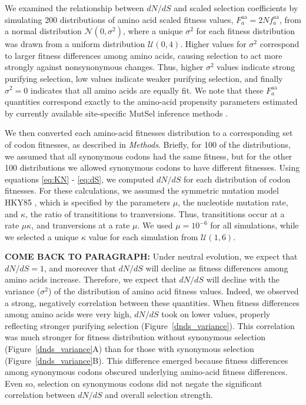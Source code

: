 \documentclass[11pt]{article}
\begin{document}
We examined the relationship between $dN/dS$ and scaled selection coefficients by simulating 200 distributions of amino acid scaled fitness values, $F^\text{aa}_a = 2Nf^\text{aa}_a$, from a normal distribution $\mathcal{N}(0,\sigma^2)$, where a unique $\sigma^2$ for each fitness distribution was drawn from a uniform distribution $\mathcal{U}(0,4)$. Higher values for $\sigma^2$ correspond to larger fitness differences among amino acids, causing selection to act more strongly against nonsynonymous changes. Thus, higher $\sigma^2$ values indicate strong purifying selection, low values indicate weaker purifying selection, and finally $\sigma^2 = 0$ indicates that all amino acids are equally fit. We note that these $F^\text{aa}_a$ quantities correspond exactly to the amino-acid propensity parameters estimated by currently available site-specific MutSel inference methods \cite{RodrigueLartillot2014,Tamurietal2014}.

We then converted each amino-acid fitnesses distribution to a corresponding set of codon fitnesses, as described in \emph{Methods}. Briefly, for 100 of the distributions, we assumed that all synonymous codons had the same fitness, but for the other 100 distributions we allowed synonymous codons to have different fitnesses. Using equations \eqref{eq:KN} - \eqref{eq:dS}, we computed $dN/dS$ for each distribution of codon fitnesses. For these calculations, we assumed the symmetric mutation model HKY85 \cite{HKY85}, which is specified by the parameters $\mu$, the nucleotide mutation rate, and $\kappa$, the ratio of transititions to tranversions. Thus, transititions occur at a rate $\mu\kappa$, and tranversions at a rate $\mu$. We used $\mu = 10^{-6}$ for all simulations, while we selected a unique $\kappa$ value for each simulation from $\mathcal{U}(1,6)$.

\textbf{COME BACK TO PARAGRAPH:}
Under neutral evolution, we expect that $dN/dS = 1$, and moreover that $dN/dS$ will decline as fitness differences among amino acids increase. Therefore, we expect that $dN/dS$ will decline with the variance ($\sigma^2$) of the distribution of amino acid fitness values. Indeed, we observed a strong, negatively correlation between these quantities. When fitness differences among amino acids were very high, $dN/dS$ took on lower values, properly reflecting stronger purifying selection (Figure~\ref{dnds_variance}). This correlation was much stronger for fitness distribution without synonymous selection (Figure~\ref{dnds_variance}A) than for those with synonymous selection (Figure~\ref{dnds_variance}B). This difference emerged because fitness differences among synonymous codons obscured underlying amino-acid fitness differences. Even so, selection on synonymous codons did not negate the significant correlation between $dN/dS$ and overall selection strength.
\end{document}
